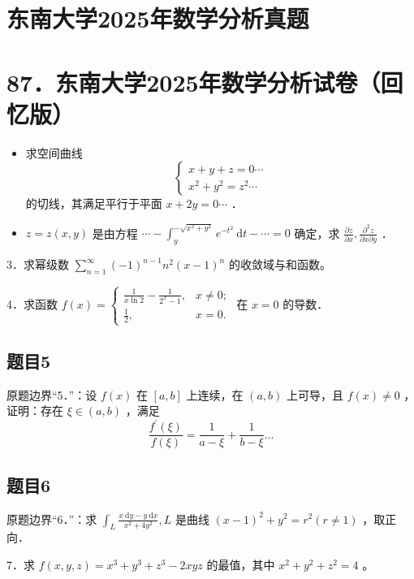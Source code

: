 \documentclass{article}
\begin{document}
\section*{东南大学2025年数学分析真题}
\section*{87．东南大学2025年数学分析试卷（回忆版）}
\begin{itemize}

  \item[1．] 求空间曲线
\[
\left\{\begin{array}{l}
x+y+z=0 \cdots \\
x^{2}+y^{2}=z^{2} \cdots
\end{array}\right.
\]
的切线，其满足平行于平面 \(x+2 y=0 \cdots\) ．

  \item[2．] \(z=z(x, y)\) 是由方程 \(\cdots-\int_{y}^{-\sqrt{x^{2}+y^{2}}} e^{-t^{2}} \mathrm{~d} t-\cdots=0\) 确定，求 \(\frac{\partial z}{\partial x}, \frac{\partial^{2} z}{\partial x \partial y}\) ．
\end{itemize}

3．求幂级数 \(\sum_{n=1}^{\infty}(-1)^{n-1} n^{2}(x-1)^{n}\) 的收敛域与和函数。

4．求函数 \(f(x)=\left\{\begin{array}{ll}\frac{1}{x \ln 2}-\frac{1}{2^{x}-1}, & x \neq 0 ; \\ \frac{1}{2}, & x=0 .\end{array}\right.\) 在 \(x=0\) 的导数．

\begin{itemize}
\end{itemize}

\subsection{题目5}
原题边界“5．”：设 \(f(x)\) 在 \([a, b]\) 上连续，在 \((a, b)\) 上可导，且 \(f(x) \neq 0\) ，证明：存在 \(\xi \in(a, b)\) ，满足
\[
\frac{f^{\prime}(\xi)}{f(\xi)}=\frac{1}{a-\xi}+\frac{1}{b-\xi} \ldots
\]

\subsection{题目6}
原题边界“6．”：求 \(\int_{L} \frac{x \mathrm{~d} y-y \mathrm{~d} x}{x^{2}+4 y^{2}}, L\) 是曲线 \((x-1)^{2}+y^{2}=r^{2}(r \neq 1)\) ，取正向．

7．求 \(f(x, y, z)=x^{3}+y^{3}+z^{3}-2 x y z\) 的最值，其中 \(x^{2}+y^{2}+z^{2}=4\) 。
\end{document}
